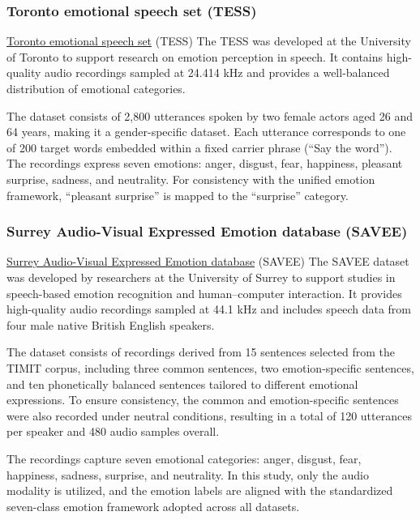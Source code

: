 \documentclass[iicol,sn-mathphys-num]{sn-jnl}%
\theoremstyle{thmstyleone}%
\theoremstyle{thmstyletwo}%
\theoremstyle{thmstylethree}%
\begin{document}
\subsubsection{Toronto emotional speech set (TESS)}\label{subsubsec3.1.4}
\href{https://www.kaggle.com/datasets/ejlok1/toronto-emotional-speech-set-tess}{Toronto emotional speech set} (TESS) The TESS was developed at the University of Toronto to support research on emotion perception in speech. It contains high-quality audio recordings sampled at 24.414 kHz and provides a well-balanced distribution of emotional categories.

The dataset consists of 2,800 utterances spoken by two female actors aged 26 and 64 years, making it a gender-specific dataset. Each utterance corresponds to one of 200 target words embedded within a fixed carrier phrase (“Say the word”). The recordings express seven emotions: anger, disgust, fear, happiness, pleasant surprise, sadness, and neutrality. For consistency with the unified emotion framework, “pleasant surprise” is mapped to the “surprise” category.


\subsubsection{Surrey Audio-Visual Expressed Emotion database (SAVEE)}\label{subsubsec3.1.5}
\href{https://www.kaggle.com/datasets/ejlok1/surrey-audiovisual-expressed-emotion-savee}{Surrey Audio-Visual Expressed Emotion database} (SAVEE) The SAVEE dataset was developed by researchers at the University of Surrey to support studies in speech-based emotion recognition and human–computer interaction. It provides high-quality audio recordings sampled at 44.1 kHz and includes speech data from four male native British English speakers.

The dataset consists of recordings derived from 15 sentences selected from the TIMIT corpus, including three common sentences, two emotion-specific sentences, and ten phonetically balanced sentences tailored to different emotional expressions. To ensure consistency, the common and emotion-specific sentences were also recorded under neutral conditions, resulting in a total of 120 utterances per speaker and 480 audio samples overall.

The recordings capture seven emotional categories: anger, disgust, fear, happiness, sadness, surprise, and neutrality. In this study, only the audio modality is utilized, and the emotion labels are aligned with the standardized seven-class emotion framework adopted across all datasets.
\end{document}
